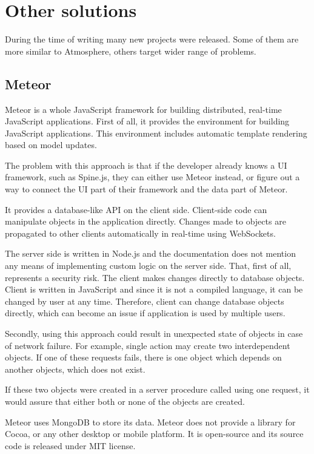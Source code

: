\section{Other solutions}

During the time of writing many new projects were released. Some of them are more similar to Atmosphere, others target wider range of problems.


\subsection{Meteor}

Meteor \citep{meteor} is a whole JavaScript framework for building distributed, real-time JavaScript applications. First of all, it provides the environment for building JavaScript applications. This environment includes automatic template rendering based on model updates.

The problem with this approach is that if the developer already knows a UI framework, such as Spine.js, \citep{spinejs} they can either use Meteor instead, or figure out a way to connect the UI part of their framework and the data part of Meteor.

It provides a database-like API on the client side. Client-side code can manipulate objects in the application directly. Changes made to objects are propagated to other clients automatically in real-time using WebSockets.

The server side is written in Node.js and the documentation \citep{meteor_doc} does not mention any means of implementing custom logic on the server side. That, first of all, represents a security risk. The client makes changes directly to database objects. Client is written in JavaScript and since it is not a compiled language, it can be changed by user at any time. Therefore, client can change database objects directly, which can become an issue if application is used by multiple users.

Secondly, using this approach could result in unexpected state of objects in case of network failure. For example, single action may create two interdependent objects. If one of these requests fails, there is one object which depends on another objects, which does not exist.

If these two objects were created in a server procedure called using one request, it would assure that either both or none of the objects are created.

Meteor uses MongoDB to store its data. Meteor does not provide a library for Cocoa, or any other desktop or mobile platform. It is open-source and its source code is released under MIT license.


